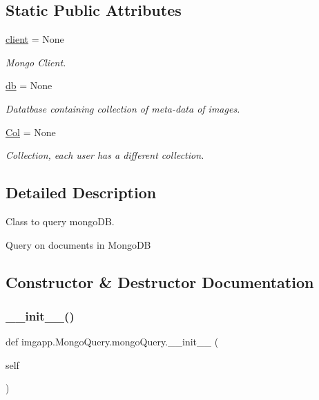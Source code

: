 \subsection*{Static Public Attributes}
\begin{DoxyCompactItemize}
\item 
\hyperlink{classimgapp_1_1MongoQuery_1_1mongoQuery_a1cdb54173fb250f4713191aa1a146d4e}{client} = None
\begin{DoxyCompactList}\small\item\em Mongo Client. \end{DoxyCompactList}\item 
\hyperlink{classimgapp_1_1MongoQuery_1_1mongoQuery_a175902875f9b19da7484777c2d76386a}{db} = None
\begin{DoxyCompactList}\small\item\em Datatbase containing collection of meta-\/data of images. \end{DoxyCompactList}\item 
\hyperlink{classimgapp_1_1MongoQuery_1_1mongoQuery_a4706154c37ca22643d084e3903f11240}{Col} = None
\begin{DoxyCompactList}\small\item\em Collection, each user has a different collection. \end{DoxyCompactList}\end{DoxyCompactItemize}


\subsection{Detailed Description}
Class to query mongo\+DB. 

Query on documents in Mongo\+DB 

\subsection{Constructor \& Destructor Documentation}
\mbox{\label{classimgapp_1_1MongoQuery_1_1mongoQuery_a479f815a109cb18629f60c824a05ca3d}} 
\subsubsection{\texorpdfstring{\+\_\+\+\_\+init\+\_\+\+\_\+()}{\_\_init\_\_()}}
{\footnotesize\ttfamily def imgapp.\+Mongo\+Query.\+mongo\+Query.\+\_\+\+\_\+init\+\_\+\+\_\+ (\begin{DoxyParamCaption}\item[{}]{self }\end{DoxyParamCaption})}



